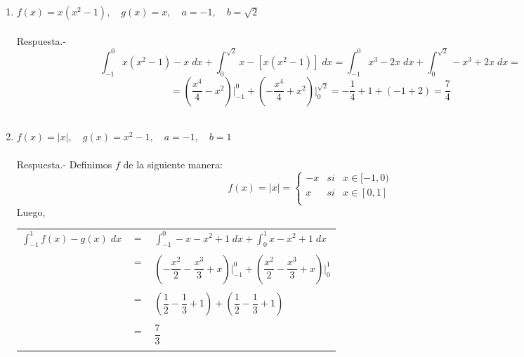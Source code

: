 \begin{enumerate}[\bfseries 1.]
\item $f(x)=x(x^2-1),\quad g(x)=x,\quad a=-1, \quad b=\sqrt{2}$\\\\
    Respuesta.-\; $$\int_{-1}^{0} x(x^2-1) - x \; dx + \int_{0}^{\sqrt{2}} x - [x(x^2-1)] \; dx = \int_{-1}^{0} x^3-2x \; dx + \int_{0}^{\sqrt{2}} - x^3 + 2x \; dx = $$
	$$=\left(\dfrac{x^4}{4} - x^2 \right)\bigg|_{-1}^0 + \left( -\dfrac{x^4}{4} + x^2 \right)\bigg|_{0}^{\sqrt{2}} = -\dfrac{1}{4} + 1 + (-1+2) = \dfrac{7}{4}$$\\

    \item $f(x)=|x|,\quad g(x) = x^2-1, \quad a=-1,\quad b=1$\\\\
	Respuesta.-\; Definimos $f$ de la siguiente manera: $$f(x) = |x| = \left\{\begin{array}{rcl}
	    -x&si&x\in [-1,0)\\
	    x&si&x\in [0,1]\\
	    \end{array}\right.$$
	    Luego,
	    \begin{center}
	    \begin{tabular}{rcl}
		$\displaystyle\int_{-1}^1 f(x)-g(x) \; dx$ & $=$ & $\displaystyle\int_{-1}^0 -x-x^2+1 \; dx + \int_0^1 x-x^2+1 \; dx$\\\\
		& $=$ & $ \left(-\dfrac{x^2}{2}-\dfrac{x^3}{3} + x \right) \bigg|_{-1}^0 + \left(\dfrac{x^2}{2} - \dfrac{x^3}{3} + x\right)\bigg|_0^1 $\\\\
		& $=$ & $\left(\dfrac{1}{2} - \dfrac{1}{3}+1\right)+\left(\dfrac{1}{2}-\dfrac{1}{3} + 1\right)$\\\\
		& $=$ & $\dfrac{7}{3}$ \\\\
	    \end{tabular}
	    \end{center}


\end{enumerate}
